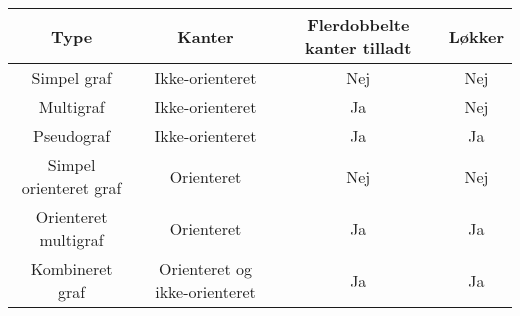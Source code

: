 \begin{tabular}{|c|c|c|c|}                                  
\hline                                                      
Type & Kanter & Flerdobbelte kanter tilladt & Løkker \\     
\hline                                                      
Simpel graf & Ikke-orienteret & Nej & Nej  \\               
                                                            
Multigraf & Ikke-orienteret & Ja & Nej \\                   
                                                            
Pseudograf & Ikke-orienteret & Ja & Ja \\                   
                                                            
Simpel orienteret graf & Orienteret & Nej & Nej \\          
                                                            
Orienteret multigraf & Orienteret & Ja & Ja \\              
                                                            
Kombineret graf & Orienteret og ikke-orienteret & Ja & Ja \\
\hline                                                      
\end{tabular}
